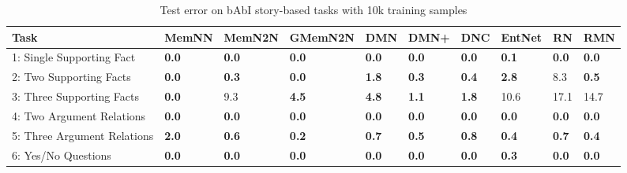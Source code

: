 \documentclass{article} \usepackage{iclr2018_conference,times}
\begin{document}
\begin{table}[t]
\centering
	\caption{Test error on bAbI story-based tasks with 10k training samples}
	\label{table:babi_result}
\begin{adjustbox}{max width=\textwidth}
\begin{tabular}{l|lllllllll}
\hline
Task                                 & \multicolumn{1}{c}{MemNN} & \multicolumn{1}{c}{MemN2N} & \multicolumn{1}{c}{GMemN2N} & \multicolumn{1}{c}{DMN} & \multicolumn{1}{c}{DMN+} & \multicolumn{1}{c}{DNC} & \multicolumn{1}{c}{EntNet\footnotemark }& \multicolumn{1}{c}{RN\footnotemark} & \multicolumn{1}{c}{RMN} \\ \hline
1: Single Supporting Fact            & \textbf{0.0}                       & \textbf{0.0}                        & \textbf{0.0} & \textbf{0.0}                     & \textbf{0.0}                      & \textbf{0.0}                     & \textbf{0.1}                        & \textbf{0.0}                    & \textbf{0.0}                     \\
2: Two Supporting Facts              & \textbf{0.0}                       & \textbf{0.3}                        & \textbf{0.0}                         & \textbf{1.8}                     & \textbf{0.3}                      & \textbf{0.4}                     & \textbf{2.8} & 8.3                    & \textbf{0.5}                     \\
3: Three Supporting Facts            & \textbf{0.0}                       & 9.3                        & \textbf{4.5                        } & \textbf{4.8}                     & \textbf{1.1}                      & \textbf{1.8}                     & 10.6                       & 17.1                  & 14.7                     \\
4: Two Argument Relations            & \textbf{0.0}                       & \textbf{0.0}                        & \textbf{0.0} & \textbf{0.0}                     & \textbf{0.0}                    & \textbf{0.0}                    & \textbf{0.0} & \textbf{0.0}                    & \textbf{0.0}                   \\
5: Three Argument Relations          & \textbf{2.0 }                      & \textbf{0.6}                        & \textbf{0.2 } & \textbf{0.7}                     & \textbf{0.5}                     &\textbf{0.8}                     &\textbf{0.4}                       & \textbf{0.7}                   & \textbf{0.4}                     \\
6: Yes/No Questions                  & \textbf{0.0}                       & \textbf{0.0}                        & \textbf{0.0} & \textbf{0.0}                     & \textbf{0.0}                      & \textbf{0.0}                     & \textbf{0.3}                       & \textbf{0.0}                    & \textbf{0.0}                     \\

\end{tabular}
\end{adjustbox}
\end{table}
\end{document}
